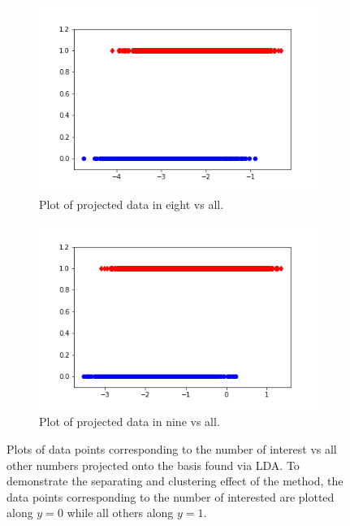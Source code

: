 \documentclass[12pt]{article}%
\numberwithin{equation}{subsection}
\begin{document}
\begin{figure}[H]
    \begin{subfigure}[b]{0.5\linewidth}
        \centering
        \includegraphics[width=\linewidth]{images/fig8.png}
        \caption{Plot of projected data in eight vs all.}
        \label{fig3:a}
        \vspace{4ex}
    \end{subfigure}%
    \begin{subfigure}[b]{0.5\linewidth}
        \centering
        \includegraphics[width=\linewidth]{images/fig9.png}
        \caption{Plot of projected data in nine vs all.}
        \label{fig3:b}
        \vspace{4ex}
    \end{subfigure}
    \caption{Plots of data points corresponding to the number of interest vs all other numbers projected onto the basis found via LDA. To demonstrate the separating and clustering effect of the method, the data points corresponding to the number of interested are plotted along $y=0$ while all others along $y=1$.}
    \label{fig3}
\end{figure}
\end{document}
